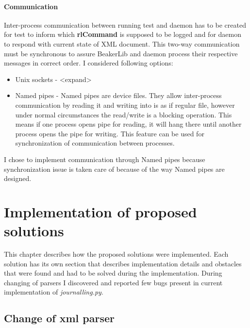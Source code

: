 \subsubsection{Communication}
Inter-process communication between running test and daemon has to be created for test to inform which \textbf{rlCommand} is supposed to be logged and for daemon to respond with current state of XML document. This two-way communication must be synchronous to assure BeakerLib and daemon process their respective messages in correct order. I considered following options:

\begin{itemize}
\item Unix sockets  -  <expand>
\item Named pipes - Named pipes are device files. They allow inter-process communication by reading it and writing into is as if regular file, however under normal circumstances the read/write is a blocking operation\cite{pipes_blocking}. This means if one process opens pipe for reading, it will hang there until another process opens the pipe for writing. This feature can be used for synchronization of communication between processes. 
\end{itemize}


I chose to implement communication through Named pipes because synchronization issue is taken care of because of the way Named pipes are designed.


\chapter{Implementation of proposed solutions}
\label{implementations}
This chapter describes how the proposed solutions were implemented. Each solution has its own section that describes implementation details and obstacles that were found and had to be solved during the implementation.
During changing of parsers I discovered and reported few bugs present in current implementation of \textit{journalling.py}.

\section{Change of xml parser}
